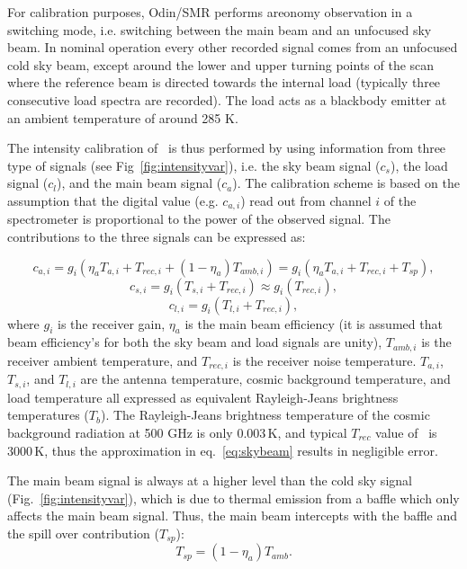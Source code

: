 For calibration purposes, Odin/SMR performs areonomy observation in a switching
mode, i.e. switching between the main beam and an unfocused sky beam. 
In nominal operation every other recorded signal comes from an unfocused cold sky
beam, except around the lower and upper turning points of the scan where the reference
beam is directed towards the internal load (typically three consecutive load spectra are
recorded). The load acts as a blackbody emitter at an ambient temperature of around 285
K. 

The intensity calibration of \smr\ is thus performed by using
information from three type of signals (see Fig~\ref{fig:intensityvar}), 
i.e. the sky beam signal (\(c_{s}\)), the load signal (\(c_{l}\)), 
and the main beam signal (\(c_{a}\)).
The calibration scheme is based on the assumption that the
digital value (e.g. \(c_{a,i}\)) read out from channel \(i\) of the
spectrometer is proportional to the power of the
observed signal. The contributions to the three signals
can be expressed as:

\begin{equation}
c_{a,i}=g_{i}\left(\eta_{a} T_{a,i} + T_{rec,i} + (1-\eta_{a})T_{amb,i} \right) = 
g_{i}\left(\eta_{a} T_{a,i} + T_{rec,i} + T_{sp} \right) ,
\end{equation}
\begin{equation}
\label{eq:skybeam}
c_{s,i}=g_{i}\left(T_{s,i}+T_{rec,i}\right) \approx g_{i}\left(T_{rec,i}\right),
\end{equation}
\begin{equation}
c_{l,i}=g_{i}\left(T_{l,i}+T_{rec,i}\right),
\end{equation}
where \(g_{i}\) is the receiver gain, \(\eta_{a}\) is the main beam
efficiency (it is assumed that beam efficiency's for
both the sky beam and load signals are unity),
\(T_{amb,i}\) is the receiver ambient temperature,
and \(T_{rec,i}\) is the receiver noise temperature.
\(T_{a,i}\), \(T_{s,i}\), and \(T_{l,i}\) are the antenna temperature,
cosmic background temperature, and load temperature all expressed
as equivalent Rayleigh-Jeans brightness temperatures (\(T_{b}\)).
The Rayleigh-Jeans brightness temperature of the cosmic background radiation
at 500 GHz is only 0.003\,K, and typical \(T_{rec}\) value of \smr\ is 3000\,K,
thus the approximation in eq.~\ref{eq:skybeam} results in negligible error.

The main beam signal is always at a higher level than the cold sky signal
(Fig.~\ref{fig:intensityvar}), which is due 
to thermal emission from a baffle which only affects the main beam signal.
Thus, the main beam intercepts with the baffle
and the spill over contribution (\(T_{sp}\)):
\begin{equation}
\label{eq:tspill1}
T_{sp}=(1-\eta_{a})T_{amb}.
\end{equation}

